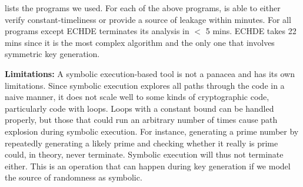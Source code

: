 

 lists the programs we used. For each of the above programs, \kt is able to either verify constant-timeliness or provide a source of leakage within minutes.
For all programs except ECHDE \kt terminates its analysis in $<$ 5 mins.
ECHDE takes 22 mins since it is the most complex algorithm and the only one that involves symmetric key generation.

\textbf{Limitations:} A symbolic execution-based tool is not a panacea and has its own limitations.
Since symbolic execution explores all paths through the code in a naive manner, it does not scale well to some kinds of cryptographic code, particularly code with loops.
Loops with a constant bound can be handled properly, but those that could run an arbitrary number of times
cause path explosion during symbolic execution.
For instance, generating a prime number by repeatedly generating a likely prime and checking whether
it really is prime could, in theory, never terminate. Symbolic execution will thus not terminate either.
This is an operation that can happen during key generation if we model the source of randomness as symbolic.
